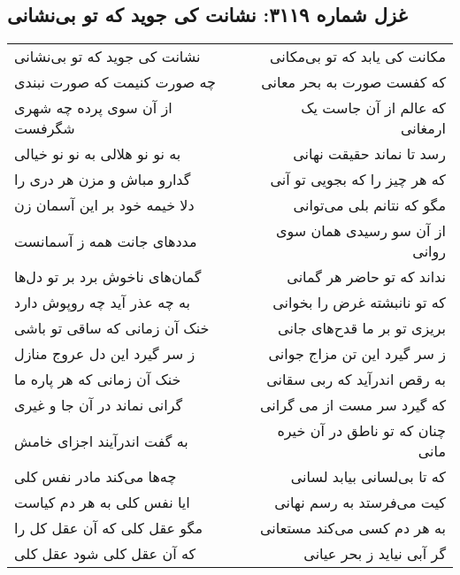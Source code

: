\begin{center}
\section*{غزل شماره ۳۱۱۹: نشانت کی جوید که تو بی‌نشانی}
\label{sec:3119}
\begin{longtable}{l p{0.5cm} r}
نشانت کی جوید که تو بی‌نشانی
&&
مکانت کی یابد که تو بی‌مکانی
\\
چه صورت کنیمت که صورت نبندی
&&
که کفست صورت به بحر معانی
\\
از آن سوی پرده چه شهری شگرفست
&&
که عالم از آن جاست یک ارمغانی
\\
به نو نو هلالی به نو نو خیالی
&&
رسد تا نماند حقیقت نهانی
\\
گدارو مباش و مزن هر دری را
&&
که هر چیز را که بجویی تو آنی
\\
دلا خیمه خود بر این آسمان زن
&&
مگو که نتانم بلی می‌توانی
\\
مددهای جانت همه ز آسمانست
&&
از آن سو رسیدی همان سوی روانی
\\
گمان‌های ناخوش برد بر تو دل‌ها
&&
نداند که تو حاضر هر گمانی
\\
به چه عذر آید چه روپوش دارد
&&
که تو نانبشته غرض را بخوانی
\\
خنک آن زمانی که ساقی تو باشی
&&
بریزی تو بر ما قدح‌های جانی
\\
ز سر گیرد این دل عروج منازل
&&
ز سر گیرد این تن مزاج جوانی
\\
خنک آن زمانی که هر پاره ما
&&
به رقص اندرآید که ربی سقانی
\\
گرانی نماند در آن جا و غیری
&&
که گیرد سر مست از می گرانی
\\
به گفت اندرآیند اجزای خامش
&&
چنان که تو ناطق در آن خیره مانی
\\
چه‌ها می‌کند مادر نفس کلی
&&
که تا بی‌لسانی بیابد لسانی
\\
ایا نفس کلی به هر دم کیاست
&&
کیت می‌فرستد به رسم نهانی
\\
مگو عقل کلی که آن عقل کل را
&&
به هر دم کسی می‌کند مستعانی
\\
که آن عقل کلی شود عقل کلی
&&
گر آبی نیاید ز بحر عیانی
\\
\end{longtable}
\end{center}
